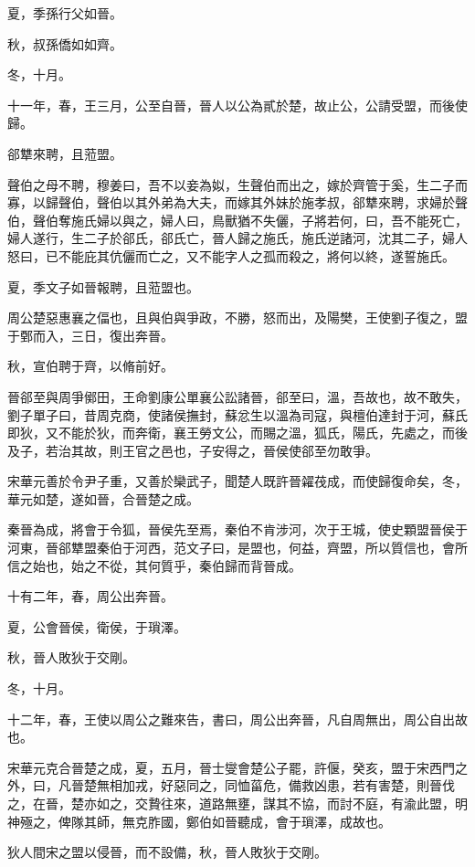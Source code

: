 \begin{pinyinscope}
夏，季孫行父如晉。

秋，叔孫僑如如齊。

冬，十月。

十一年，春，王三月，公至自晉，晉人以公為貳於楚，故止公，公請受盟，而後使歸。

郤犨來聘，且蒞盟。

聲伯之母不聘，穆姜曰，吾不以妾為姒，生聲伯而出之，嫁於齊管于奚，生二子而寡，以歸聲伯，聲伯以其外弟為大夫，而嫁其外妹於施孝叔，郤犨來聘，求婦於聲伯，聲伯奪施氏婦以與之，婦人曰，鳥獸猶不失儷，子將若何，曰，吾不能死亡，婦人遂行，生二子於郤氏，郤氏亡，晉人歸之施氏，施氏逆諸河，沈其二子，婦人怒曰，已不能庇其伉儷而亡之，又不能字人之孤而殺之，將何以終，遂誓施氏。

夏，季文子如晉報聘，且蒞盟也。

周公楚惡惠襄之偪也，且與伯與爭政，不勝，怒而出，及陽樊，王使劉子復之，盟于鄄而入，三日，復出奔晉。

秋，宣伯聘于齊，以脩前好。

晉郤至與周爭鄇田，王命劉康公單襄公訟諸晉，郤至曰，溫，吾故也，故不敢失，劉子單子曰，昔周克商，使諸侯撫封，蘇忿生以溫為司寇，與檀伯達封于河，蘇氏即狄，又不能於狄，而奔衛，襄王勞文公，而賜之溫，狐氏，陽氏，先處之，而後及子，若治其故，則王官之邑也，子安得之，晉侯使郤至勿敢爭。

宋華元善於令尹子重，又善於欒武子，聞楚人既許晉糴茷成，而使歸復命矣，冬，華元如楚，遂如晉，合晉楚之成。

秦晉為成，將會于令狐，晉侯先至焉，秦伯不肯涉河，次于王城，使史顆盟晉侯于河東，晉郤犨盟秦伯于河西，范文子曰，是盟也，何益，齊盟，所以質信也，會所信之始也，始之不從，其何質乎，秦伯歸而背晉成。

十有二年，春，周公出奔晉。

夏，公會晉侯，衛侯，于瑣澤。

秋，晉人敗狄于交剛。

冬，十月。

十二年，春，王使以周公之難來告，書曰，周公出奔晉，凡自周無出，周公自出故也。

宋華元克合晉楚之成，夏，五月，晉士燮會楚公子罷，許偃，癸亥，盟于宋西門之外，曰，凡晉楚無相加戎，好惡同之，同恤菑危，備救凶患，若有害楚，則晉伐之，在晉，楚亦如之，交贄往來，道路無壅，謀其不協，而討不庭，有渝此盟，明神殛之，俾隊其師，無克胙國，鄭伯如晉聽成，會于瑣澤，成故也。

狄人間宋之盟以侵晉，而不設備，秋，晉人敗狄于交剛。


\end{pinyinscope}
